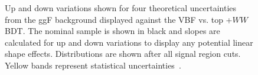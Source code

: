 \begin{figure}[!h]
  \hfill
  \hfill
  \hfill
  \hfill
{\caption{Up and down variations shown for four theoretical uncertainties from the ggF background displayed against the VBF vs. top +$WW$ BDT. The nominal sample is shown in black and slopes are calculated for up and down variations to display any potential linear shape effects. Distributions are shown after all signal region cuts. Yellow bands represent statistical uncertainties~\cite{ourSupportNote}.
\label{fig:ggftheor}}}
\end{figure}

